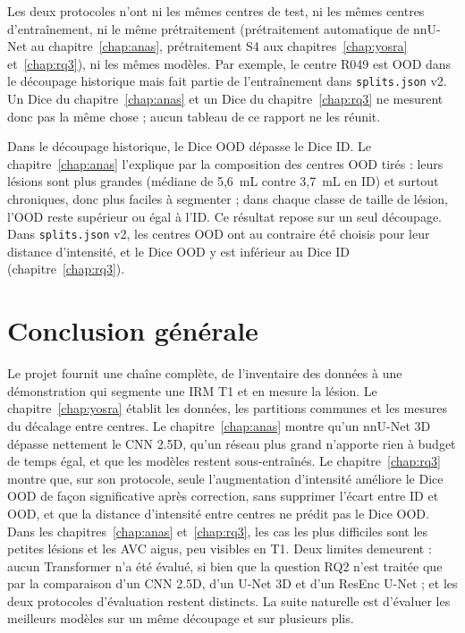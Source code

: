 \documentclass[11pt,a4paper]{report}
\begin{document}
Les deux protocoles n'ont ni les mêmes centres de test, ni les mêmes centres d'entraînement, ni le même prétraitement (prétraitement automatique de nnU-Net au chapitre~\ref{chap:anas}, prétraitement S4 aux chapitres~\ref{chap:yosra} et~\ref{chap:rq3}), ni les mêmes modèles.
Par exemple, le centre R049 est OOD dans le découpage historique mais fait partie de l'entraînement dans \nolinkurl{splits.json} v2.
Un Dice du chapitre~\ref{chap:anas} et un Dice du chapitre~\ref{chap:rq3} ne mesurent donc pas la même chose ; aucun tableau de ce rapport ne les réunit.

Dans le découpage historique, le Dice OOD dépasse le Dice ID.
Le chapitre~\ref{chap:anas} l'explique par la composition des centres OOD tirés : leurs lésions sont plus grandes (médiane de 5,6~mL contre 3,7~mL en ID) et surtout chroniques, donc plus faciles à segmenter ; dans chaque classe de taille de lésion, l'OOD reste supérieur ou égal à l'ID.
Ce résultat repose sur un seul découpage.
Dans \nolinkurl{splits.json} v2, les centres OOD ont au contraire été choisis pour leur distance d'intensité, et le Dice OOD y est inférieur au Dice ID (chapitre~\ref{chap:rq3}).





\chapter*{Conclusion générale}
\label{chap:conclusion}

Le projet fournit une chaîne complète, de l'inventaire des données à une démonstration qui segmente une IRM T1 et en mesure la lésion.
Le chapitre~\ref{chap:yosra} établit les données, les partitions communes et les mesures du décalage entre centres.
Le chapitre~\ref{chap:anas} montre qu'un nnU-Net 3D dépasse nettement le CNN 2.5D, qu'un réseau plus grand n'apporte rien à budget de temps égal, et que les modèles restent sous-entraînés.
Le chapitre~\ref{chap:rq3} montre que, sur son protocole, seule l'augmentation d'intensité améliore le Dice OOD de façon significative après correction, sans supprimer l'écart entre ID et OOD, et que la distance d'intensité entre centres ne prédit pas le Dice OOD.
Dans les chapitres~\ref{chap:anas} et~\ref{chap:rq3}, les cas les plus difficiles sont les petites lésions et les AVC aigus, peu visibles en T1.
Deux limites demeurent : aucun Transformer n'a été évalué, si bien que la question RQ2 n'est traitée que par la comparaison d'un CNN 2.5D, d'un U-Net 3D et d'un ResEnc U-Net ; et les deux protocoles d'évaluation restent distincts.
La suite naturelle est d'évaluer les meilleurs modèles sur un même découpage et sur plusieurs plis.

\appendix




\end{document}
